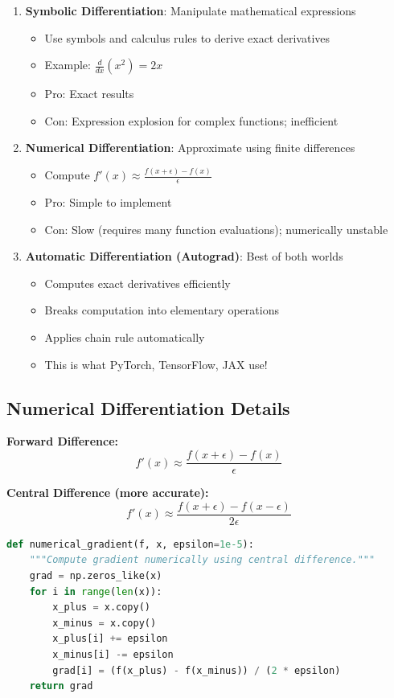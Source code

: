 \begin{enumerate}
    \item \textbf{Symbolic Differentiation}: Manipulate mathematical expressions
    \begin{itemize}
        \item Use symbols and calculus rules to derive exact derivatives
        \item Example: $\frac{d}{dx}(x^2) = 2x$
        \item Pro: Exact results
        \item Con: Expression explosion for complex functions; inefficient
    \end{itemize}
    
    \item \textbf{Numerical Differentiation}: Approximate using finite differences
    \begin{itemize}
        \item Compute $f'(x) \approx \frac{f(x + \epsilon) - f(x)}{\epsilon}$
        \item Pro: Simple to implement
        \item Con: Slow (requires many function evaluations); numerically unstable
    \end{itemize}
    
    \item \textbf{Automatic Differentiation (Autograd)}: Best of both worlds
    \begin{itemize}
        \item Computes exact derivatives efficiently
        \item Breaks computation into elementary operations
        \item Applies chain rule automatically
        \item This is what PyTorch, TensorFlow, JAX use!
    \end{itemize}
\end{enumerate}

\subsection{Numerical Differentiation Details}

\textbf{Forward Difference:}
\[
f'(x) \approx \frac{f(x + \epsilon) - f(x)}{\epsilon}
\]

\textbf{Central Difference (more accurate):}
\[
f'(x) \approx \frac{f(x + \epsilon) - f(x - \epsilon)}{2\epsilon}
\]

\begin{lstlisting}[language=Python, caption={Numerical Differentiation}]
def numerical_gradient(f, x, epsilon=1e-5):
    """Compute gradient numerically using central difference."""
    grad = np.zeros_like(x)
    for i in range(len(x)):
        x_plus = x.copy()
        x_minus = x.copy()
        x_plus[i] += epsilon
        x_minus[i] -= epsilon
        grad[i] = (f(x_plus) - f(x_minus)) / (2 * epsilon)
    return grad
\end{lstlisting}


